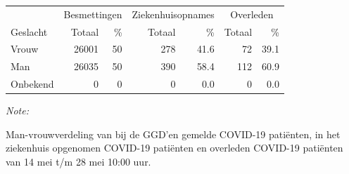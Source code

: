 \documentclass[
  english,
  man,floatsintext]{apa6}
\begin{document}
\begin{table}
\centering\begingroup\fontsize{11}{13}\selectfont

\begin{threeparttable}
\begin{tabular}{lrrrrrr}
\toprule
\multicolumn{1}{c}{ } & \multicolumn{2}{c}{Besmettingen} & \multicolumn{2}{c}{Ziekenhuisopnames} & \multicolumn{2}{c}{Overleden} \\
\cmidrule(l{3pt}r{3pt}){2-3} \cmidrule(l{3pt}r{3pt}){4-5} \cmidrule(l{3pt}r{3pt}){6-7}
Geslacht & Totaal & \% & Totaal & \% & Totaal & \%\\
\midrule
Vrouw & 26001 & 50 & 278 & 41.6 & 72 & 39.1\\
Man & 26035 & 50 & 390 & 58.4 & 112 & 60.9\\
Onbekend & 0 & 0 & 0 & 0.0 & 0 & 0.0\\
\bottomrule
\end{tabular}
\begin{tablenotes}
\item \textit{Note: } 
\item Man-vrouwverdeling van bij de GGD’en gemelde COVID-19 patiënten, in het ziekenhuis opgenomen COVID-19 patiënten en overleden COVID-19 patiënten van 14 mei t/m 28 mei 10:00 uur.
\end{tablenotes}
\end{threeparttable}
\endgroup{}
\end{table}
\newpage
\end{document}
